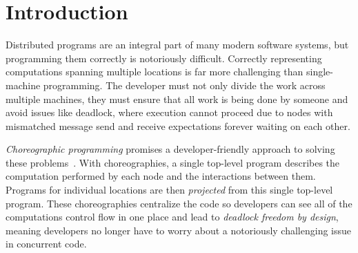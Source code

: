 \section{Introduction}
\label{sec:introduction}

Distributed programs are an integral part of many modern software systems, but programming them correctly is notoriously difficult.
Correctly representing computations spanning multiple locations is far more challenging than single-machine programming.
The developer must not only divide the work across multiple machines, they must ensure that all work is being done by someone
and avoid issues like deadlock, where execution cannot proceed due to nodes with mismatched message send and receive expectations forever waiting on each other.


\emph{Choreographic programming} promises a developer-friendly approach to solving these problems~\citep{Montesi22}.
With choreographies, a single top-level program describes the computation performed by each node and the interactions between them.
Programs for individual locations are then \emph{projected} from this single top-level program.
These choreographies centralize the code so developers can see all of the computations control flow in one place
and lead to \emph{deadlock freedom by design}, meaning developers no longer have to worry about a notoriously challenging issue in concurrent code.

